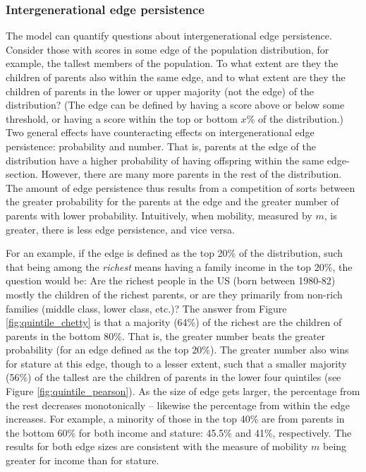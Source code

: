 \documentclass[a4paper,11pt]{article} %
\begin{document}
\subsubsection*{Intergenerational edge persistence}

The model can quantify questions about intergenerational edge persistence. Consider those with scores in some edge of the population distribution, for example, the tallest members of the population. To what extent are they the children of parents also within the same edge, and to what extent are they the children of parents in the lower or upper majority (not the edge) of the distribution? (The edge can be defined by having a score above or below some threshold, or having a score within the top or bottom $x$\% of the distribution.) Two general effects have counteracting effects on intergenerational edge persistence: probability and number. That is, parents at the edge of the distribution have a higher probability of having offspring within the same edge-section. However, there are many more parents in the rest of the distribution. The amount of edge persistence thus results from a competition of sorts between the greater probability for the parents at the edge and the greater number of parents with lower probability. Intuitively, when mobility, measured by $m$, is greater, there is less edge persistence, and vice versa. 

For an example, if the edge is defined as the top 20\% of the distribution, such that being among the \emph{richest} means having a family income in the top 20\%, the question would be: Are the richest people in the US (born between 1980-82) mostly the children of the richest parents, or are they primarily from non-rich families (middle class, lower class, etc.)? The answer from Figure \ref{fig:quintile_chetty} is that a majority (64\%) of the richest are the children of parents in the bottom 80\%. That is, the greater number beats the greater probability (for an edge defined as the top 20\%). The greater number also wins for stature at this edge, though to a lesser extent, such that a smaller majority (56\%) of the tallest are the children of parents in the lower four quintiles (see Figure \ref{fig:quintile_pearson}). As the size of edge gets larger, the percentage from the rest decreases monotonically -- likewise the percentage from within the edge increases. For example, a minority of those in the top 40\% are from parents in the bottom 60\% for both income and stature: 45.5\% and 41\%, respectively. The results for both edge sizes are consistent with the measure of mobility $m$ being greater for income than for stature. 
\end{document}
